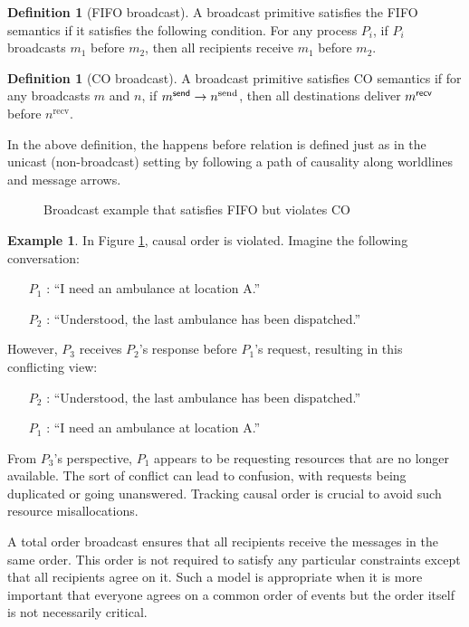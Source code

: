 \documentclass[]             %
{NASA}                       %
\theoremstyle{definition}
\newtheorem{example}[theorem]{Example}
\newtheorem{definition}[theorem]{Definition}
\providecommand{\tightlist}{%
  \setlength{\itemsep}{0pt}\setlength{\parskip}{0pt}}
\begin{document}
\begin{definition}[FIFO broadcast]
  \label{def:fifo-bcast}
  A broadcast primitive satisfies the FIFO semantics if it satisfies
  the following condition. For any process $P_i$, if $P_i$ broadcasts
  $m_1$ before $m_2$, then all recipients receive $m_1$ before $m_2$.
\end{definition}

\begin{definition}[CO broadcast]
  \label{def:causalorder-bcast}
  A broadcast primitive satisfies CO semantics if for any broadcasts
  $m$ and $n$, if $m_{}^{\mathsf{send}} \to n^{\textrm{send}}$, then all
  destinations deliver $m_{}^{\mathsf{recv}}$ before $n^{\textrm{recv}}$.
\end{definition}
In the above definition, the happens before relation is defined just
as in the unicast (non-broadcast) setting by following a path of
causality along worldlines and message arrows.

\begin{figure}[h]
  \centering 
  \caption{Broadcast example that satisfies FIFO but violates CO}
  \label{fig:broadcast-fifo-1}
\end{figure}

\begin{example}
  In Figure \ref{fig:broadcast-fifo-1}, causal order is violated. Imagine the following conversation:
  \begin{itemize}
    \tightlist
  \item [$P_1$]: ``I need an ambulance at location A.''
  \item [$P_2$]: ``Understood, the last ambulance has been dispatched.''
  \end{itemize}
  However, $P_3$ receives $P_2$'s response before $P_1$'s request, resulting in this conflicting view:
  \begin{itemize}
    \tightlist
  \item [$P_2$]: ``Understood, the last ambulance has been dispatched.''
  \item [$P_1$]: ``I need an ambulance at location A.''
  \end{itemize}
  From $P_3$'s perspective, $P_1$ appears to be requesting resources
  that are no longer available. The sort of conflict can lead to
  confusion, with requests being duplicated or going
  unanswered. Tracking causal order is crucial to avoid such resource
  misallocations.
\end{example}

A total order broadcast ensures that all recipients receive the
messages in the same order. This order is not required to satisfy any
particular constraints except that all recipients agree on it. Such a
model is appropriate when it is more important that everyone agrees on
a common order of events but the order itself is not necessarily
critical.
\end{document}
